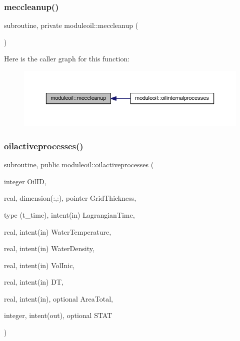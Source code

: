 \subsubsection{\texorpdfstring{meccleanup()}{meccleanup()}}
{\footnotesize\ttfamily subroutine, private moduleoil\+::meccleanup (\begin{DoxyParamCaption}{ }\end{DoxyParamCaption})\hspace{0.3cm}{\ttfamily [private]}}

Here is the caller graph for this function\+:\nopagebreak
\begin{figure}[H]
\begin{center}
\leavevmode
\includegraphics[width=350pt]{namespacemoduleoil_a2e2c8b7a65ec01bb12cb4ae2225bc7e2_icgraph}
\end{center}
\end{figure}
\mbox{\label{namespacemoduleoil_aa53749d5416d21d1602ffd0208f0f8f2}} 
\subsubsection{\texorpdfstring{oilactiveprocesses()}{oilactiveprocesses()}}
{\footnotesize\ttfamily subroutine, public moduleoil\+::oilactiveprocesses (\begin{DoxyParamCaption}\item[{integer}]{Oil\+ID,  }\item[{real, dimension(\+:,\+:), pointer}]{Grid\+Thickness,  }\item[{type (t\+\_\+time), intent(in)}]{Lagrangian\+Time,  }\item[{real, intent(in)}]{Water\+Temperature,  }\item[{real, intent(in)}]{Water\+Density,  }\item[{real, intent(in)}]{Vol\+Inic,  }\item[{real, intent(in)}]{DT,  }\item[{real, intent(in), optional}]{Area\+Total,  }\item[{integer, intent(out), optional}]{S\+T\+AT }\end{DoxyParamCaption})}

